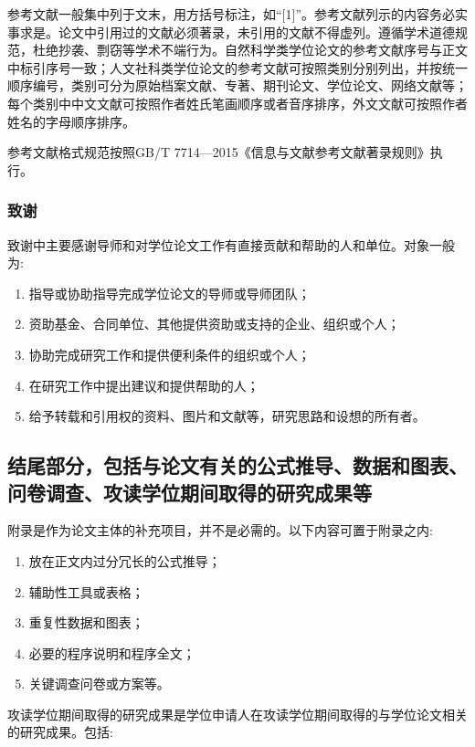 参考文献一般集中列于文末，用方括号标注，如“[1]”。参考文献列示的内容务必实事求是。论文中引用过的文献必须著录，未引用的文献不得虚列。遵循学术道德规范，杜绝抄袭、剽窃等学术不端行为。自然科学类学位论文的参考文献序号与正文中标引序号一致；人文社科类学位论文的参考文献可按照类别分别列出，并按统一顺序编号，类别可分为原始档案文献、专著、期刊论文、学位论文、网络文献等；每个类别中中文文献可按照作者姓氏笔画顺序或者音序排序，外文文献可按照作者姓名的字母顺序排序。

参考文献格式规范按照GB/T 7714—2015《信息与文献参考文献著录规则》执行。

\subsubsection{致谢}


致谢中主要感谢导师和对学位论文工作有直接贡献和帮助的人和单位。对象一般为:

\begin{enumerate}[1)]
    \item 指导或协助指导完成学位论文的导师或导师团队；
    \item 资助基金、合同单位、其他提供资助或支持的企业、组织或个人；
    \item 协助完成研究工作和提供便利条件的组织或个人；
    \item 在研究工作中提出建议和提供帮助的人；
    \item 给予转载和引用权的资料、图片和文献等，研究思路和设想的所有者。
\end{enumerate}

\subsection{结尾部分，包括与论文有关的公式推导、数据和图表、问卷调查、攻读学位期间取得的研究成果等}

附录是作为论文主体的补充项目，并不是必需的。以下内容可置于附录之内:

\begin{enumerate}[1)]
    \item 放在正文内过分冗长的公式推导；
    \item 辅助性工具或表格；
    \item 重复性数据和图表；
    \item 必要的程序说明和程序全文；
    \item 关键调查问卷或方案等。
\end{enumerate}

攻读学位期间取得的研究成果是学位申请人在攻读学位期间取得的与学位论文相关的研究成果。包括:

